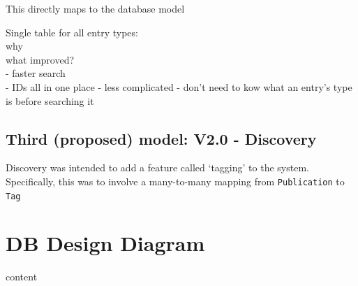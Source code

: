 This directly maps to the database model

Single table for all entry types:\\
why\\
what improved?\\
 - faster search\\
 - IDs all in one place - less complicated - don't need to kow what an entry's type is before searching it\\

\subsection{Third (proposed) model: V2.0 - Discovery}
\label{designDiscovery}
Discovery was intended to add a feature called `tagging' to the system.  \\
Specifically, this was to involve a many-to-many mapping from \texttt{Publication} to \texttt{Tag}


\section{DB Design Diagram}
content
